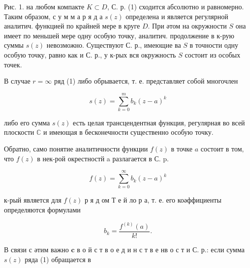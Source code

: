 \documentclass[10pt]{article}
\begin{document}
Рис. 1. на любом компакте $K \subset D$, С. р. (1) сходится абсолютно и равномерно. Таким образом, с у м м а р я д а $s(z)$ определена и является регулярной аналитич. функцией по крайней мере в круге $D$. При әтом на окружности $S$ она имеет по меньшей мере одну особую точку, аналитич. продолжение в к-рую суммы $s(z)$ невозможно. Существуют С. р., имеющие ва $S$ в точности одну особую точку, равно как и С. р., у к-рых вся окружность $S$ состоит из особых точек.



В случае $r=\infty$ ряд (1) либо обрывается, т. е. представляет собой многочлен



\[

s(z)=\sum_{k=0}^{m} b_{k}(z-a)^{k}

\]



либо его сумма $s(z)$ есть целая трансцендентная функция, регулярная во всей плоскости $\mathbb{C}$ и имеющая в бесконечности существенно особую точку.



Обратно, само понятие аналитичности функции $f(z)$ в точке $a$ состоит в том, что $f(z)$ в нек-рой окрестностй a разлагается в С. p.



\[

f(z)=\sum_{k=0}^{\infty} b_{k}(z-a)^{k}

\]



к-рый является для $f(z)$ р я д ом Т е й ло р а, т. е. его коәффициенты определяются формулами



\[

b_{k}=\frac{f^{(k)}(a)}{k !} .

\]



В связи с әтим важно $\boldsymbol{c}$ в о й $\boldsymbol{с}$ т в о е д и н с т в е нв о с т и С. р.: если сумма $s(z)$ ряда (1) обращается в
\end{document}
